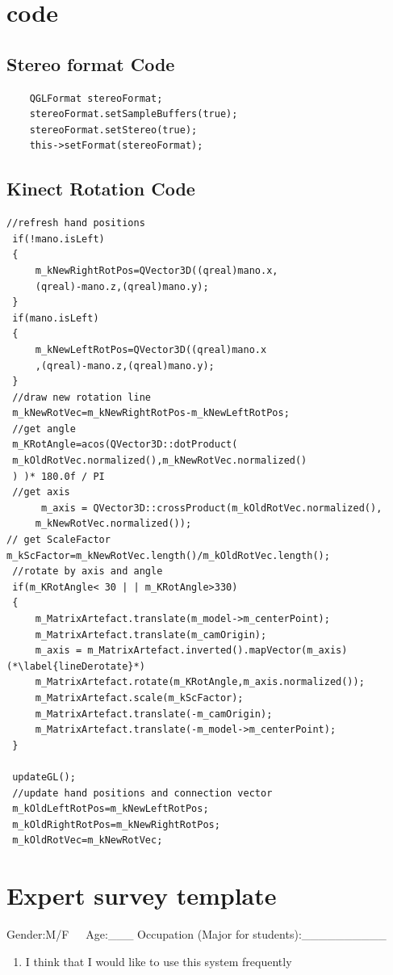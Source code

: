 \documentclass[12pt]{extarticle}
\begin{document}
\begin{appendices}
\section{code}
\subsection {Stereo format Code}\label{app:StereoFormat}
\begin{lstlisting}
    QGLFormat stereoFormat;
    stereoFormat.setSampleBuffers(true);
    stereoFormat.setStereo(true);
    this->setFormat(stereoFormat);
\end{lstlisting}
\subsection {Kinect Rotation Code}\label{app:codeRot}
\begin{lstlisting}
//refresh hand positions
 if(!mano.isLeft)
 {
     m_kNewRightRotPos=QVector3D((qreal)mano.x,
     (qreal)-mano.z,(qreal)mano.y);
 }
 if(mano.isLeft)
 {
     m_kNewLeftRotPos=QVector3D((qreal)mano.x
     ,(qreal)-mano.z,(qreal)mano.y);
 }
 //draw new rotation line
 m_kNewRotVec=m_kNewRightRotPos-m_kNewLeftRotPos;
 //get angle
 m_KRotAngle=acos(QVector3D::dotProduct(
 m_kOldRotVec.normalized(),m_kNewRotVec.normalized()
 ) )* 180.0f / PI
 //get axis
      m_axis = QVector3D::crossProduct(m_kOldRotVec.normalized(),
     m_kNewRotVec.normalized());
// get ScaleFactor
m_kScFactor=m_kNewRotVec.length()/m_kOldRotVec.length();
 //rotate by axis and angle
 if(m_KRotAngle< 30 | | m_KRotAngle>330)
 {
     m_MatrixArtefact.translate(m_model->m_centerPoint);
     m_MatrixArtefact.translate(m_camOrigin);
     m_axis = m_MatrixArtefact.inverted().mapVector(m_axis)(*\label{lineDerotate}*)
     m_MatrixArtefact.rotate(m_KRotAngle,m_axis.normalized());
     m_MatrixArtefact.scale(m_kScFactor);
     m_MatrixArtefact.translate(-m_camOrigin);
     m_MatrixArtefact.translate(-m_model->m_centerPoint);
 }

 updateGL();
 //update hand positions and connection vector
 m_kOldLeftRotPos=m_kNewLeftRotPos;
 m_kOldRightRotPos=m_kNewRightRotPos;
 m_kOldRotVec=m_kNewRotVec;
\end{lstlisting}

\pagebreak{}
\section{Expert survey template}\label{app:survey}
\begin{center}
Gender:M/F\ \ \ Age:\_\_\_      Occupation (Major for students):\_\_\_\_\_\_\_\_\_\_
\begin{enumerate}
\item I think that I would like to use this system frequently


\end{enumerate}
\end{center}
\end{appendices}
\end{document}
